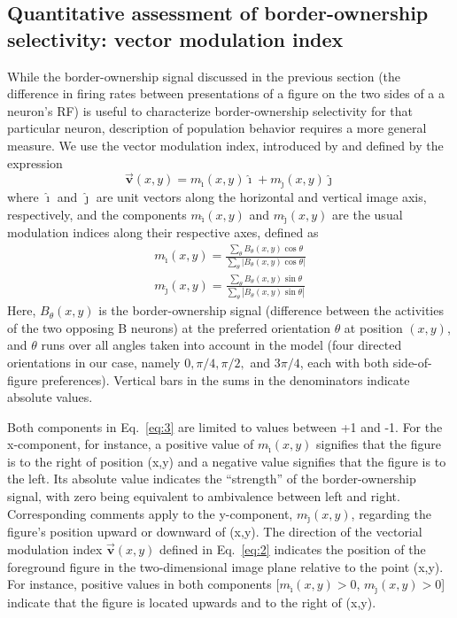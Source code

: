 \subsection{Quantitative assessment of border-ownership selectivity:
  vector modulation index}
\label{sec:vmi}

While the border-ownership signal discussed in the previous section (the difference in firing rates between presentations of a figure on the two sides of a a neuron's RF) is useful to characterize border-ownership selectivity for that particular neuron, description of population behavior requires a more general measure. We use the vector modulation index, introduced by \cite{Craft_etal07} and defined
by the expression 
\begin{equation}
\label{eq:2}
\overrightarrow{\mathbf{v}}(x,y) = m_{\hat{\imath}}(x,y)\hat{\imath} + m_{\hat{\jmath}}(x,y)\hat{\jmath}
\end{equation}
where $\hat{\imath}$ and $\hat{\jmath}$ are unit vectors along the horizontal and vertical image axis, respectively, and the components $m_{\hat{\imath}}(x,y)$ and $m_{\hat{\jmath}}(x,y)$ are the usual modulation indices along their respective axes, defined as
\begin{equation}
\label{eq:3}
\begin{split}
	m_{\hat{\imath}}(x,y) = \frac{\sum_{\theta}
        B_{\theta}(x,y)\cos\theta}{\sum_{\theta}
                \left|B_{\theta}(x,y)\cos\theta\right|} \\
	m_{\hat{\jmath}}(x,y) = \frac{\sum_{\theta}
        B_{\theta}(x,y)\sin\theta}{\sum_{\theta}
                \left|B_{\theta}(x,y)\sin\theta\right|}
\end{split}
\end{equation}
Here, $B_{\theta}(x,y)$ is the border-ownership signal (difference between the activities of the two opposing B neurons) at the preferred
orientation $\theta$ at position $(x,y)$, and $\theta$ runs over all
angles taken into account in the model (four directed orientations in our case, namely $0, \pi/4, \pi/2,$ and $3\pi/4$, each with both side-of-figure preferences). Vertical bars in the sums in the denominators indicate absolute values.

Both components in Eq.~\ref{eq:3} are limited to values between +1 and
-1. For the x-component, for instance, a positive value of
$m_{\hat{\imath}}(x,y)$ signifies that the figure is to the right of
position (x,y) and a negative value signifies that the figure is to
the left. Its absolute value indicates the ``strength'' of the
border-ownership signal, with zero being equivalent to ambivalence
between left and right. Corresponding comments apply to the y-component, $m_{\hat{\jmath}}(x,y)$, regarding the figure's position
upward or downward of (x,y). The direction of the vectorial modulation
index $\overrightarrow{\mathbf{v}}(x,y)$ defined in Eq.~\ref{eq:2} indicates the position of the foreground figure in the two-dimensional image plane relative to the point (x,y). For instance, positive values in both components [$m_{\hat{\imath}}(x,y) > 0$, $m_{\hat{\jmath}}(x,y) > 0$] indicate that the figure is located upwards and to the right of (x,y).

